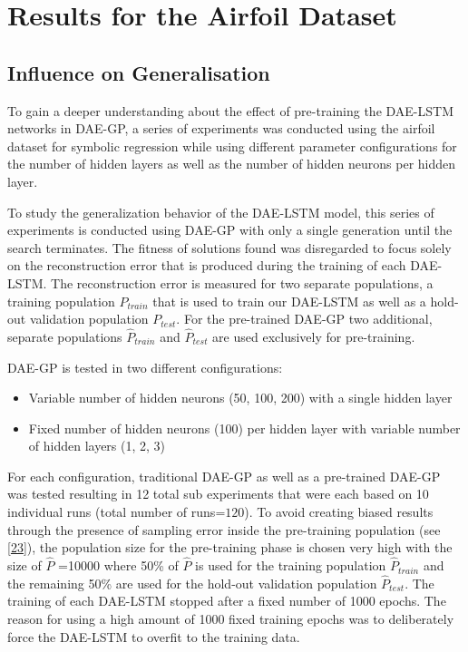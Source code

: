 \documentclass[
  11pt,
]{article}
\providecommand{\tightlist}{%
  \setlength{\itemsep}{0pt}\setlength{\parskip}{0pt}}
\begin{document}
\hypertarget{results-for-the-airfoil-dataset}{%
\section{Results for the Airfoil Dataset}\label{results-for-the-airfoil-dataset}}

\hypertarget{influence-on-generalisation}{%
\subsection{Influence on Generalisation}\label{influence-on-generalisation}}

To gain a deeper understanding about the effect of pre-training the DAE-LSTM networks in DAE-GP, a series of experiments was conducted using the airfoil dataset for symbolic regression while using different parameter configurations for the number of hidden layers as well as the number of hidden neurons per hidden layer.

To study the generalization behavior of the DAE-LSTM model, this series of experiments is conducted using DAE-GP with only a single generation until the search terminates.
The fitness of solutions found was disregarded to focus solely on the reconstruction error that is produced during the training of each DAE-LSTM.
The reconstruction error is measured for two separate populations, a training population \(P_{train}\) that is used to train our DAE-LSTM as well as a hold-out validation population \(P_{test}\).
For the pre-trained DAE-GP two additional, separate populations \(\hat{P}_{train}\) and \(\hat{P}_{test}\) are used exclusively for pre-training.

DAE-GP is tested in two different configurations:

\begin{itemize}
\tightlist
\item
  Variable number of hidden neurons (50, 100, 200) with a single hidden layer
\item
  Fixed number of hidden neurons (100) per hidden layer with variable number of hidden layers (1, 2, 3)
\end{itemize}

For each configuration, traditional DAE-GP as well as a pre-trained DAE-GP was tested resulting in 12 total sub experiments that were each based on 10 individual runs (total number of runs=\(120\)).
To avoid creating biased results through the presence of sampling error inside the pre-training population (see {[}\protect\hyperlink{ref-sampling_err_gp}{23}{]}), the population size for the pre-training phase is chosen very high with the size of \(\hat{P}\) =10000 where 50\% of \(\hat{P}\) is used for the training population \(\hat{P}_{train}\) and the remaining 50\% are used for the hold-out validation population \(\hat{P}_{test}\).
The training of each DAE-LSTM stopped after a fixed number of 1000 epochs.
The reason for using a high amount of 1000 fixed training epochs was to deliberately force the DAE-LSTM to overfit to the training data.
\end{document}
